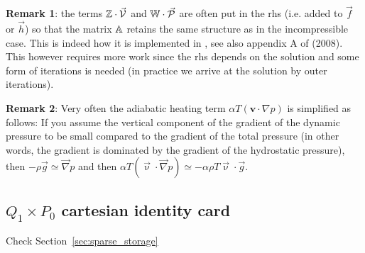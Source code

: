  
{\bf Remark 1}: the terms ${\mathbb{Z}}\cdot \vec{\cal V}$ and ${\mathbb{W}}\cdot \vec{\cal P}$ are 
often put in the rhs (i.e. added to $\vec{f}$ or $\vec{h}$) so that 
the matrix ${\mathbb{A}}$ retains the same structure as in the incompressible case. This is indeed 
how it is implemented in \aspect, see also appendix A of \textcite{lezh08} (2008). 
This however requires more work since the rhs depends 
on the solution and some form of iterations is needed (in practice we arrive at the 
solution by outer iterations). 

{\bf Remark 2}: Very often the adiabatic heating term  
$\alpha T \left( \bm v \cdot \nabla p \right)$ is simplified as follows:
If you assume the vertical component of the gradient of the dynamic pressure to be small compared to the
gradient of the total pressure (in other words, the gradient is dominated by the gradient of the hydrostatic
pressure), then $-\rho {\vec g} \simeq {\vec \nabla}p$ and then 
$\alpha T \left( \vec\upnu \cdot \vec\nabla p \right) \simeq  
-\alpha\rho T {\vec\upnu}\cdot{\vec g}$. 




\newpage
\subsection{$Q_1\times P_0$ cartesian identity card}

Check Section~\ref{sec:sparse_storage}

